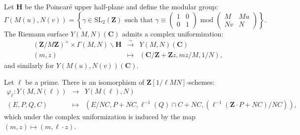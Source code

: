 \documentclass[10pt,letterpaper]{amsart}
\theoremstyle{plain}
\theoremstyle{definition}
\theoremstyle{definition}
\theoremstyle{plain}
\theoremstyle{plain}
\theoremstyle{plain}
\theoremstyle{remark}
\numberwithin{equation}{section}
\newcommand{\bC}{\mathbf{C}}
\newcommand{\Z}{\mathbf{Z}}
\begin{document}
Let $\mathbf{H}$ be the Poincar\'e upper half-plane and define the modular group:
\begin{equation*}
    \Gamma(M(u),N(v))=\left\{
  \gamma\in \mathrm{SL}_2(\Z) \text{ such that } \gamma\equiv\begin{pmatrix}
1 & 0\\
0 & 1 
\end{pmatrix}\text{ mod } \begin{pmatrix}
M & Mu\\
Nv & N 
\end{pmatrix} \right\}.
\end{equation*}
The Riemann surface $Y(M,N)(\bC)$ admits a complex uniformization:
\begin{equation*}
\begin{array}{ccc}
       (\Z/M\Z)^{\times}\times \Gamma(M,N)\backslash \mathbf{H}&\xrightarrow{\sim} &Y(M,N)(\bC)  \\
    (m,z) &\mapsto &(\bC/\Z+\Z z,mz/M,1/N), 
\end{array}
\end{equation*}
and similarly for $Y(M(u),N(v))(\bC)$.

Let $\ell$ be a prime. There is an isomorphism of $\Z[1/\ell MN]$-schemes:
\begin{equation*}
    \begin{array}{ccl}
         \varphi_\ell:Y(M,N(\ell))&\rightarrow &Y(M(\ell),N)  \\
        (E,P,Q,C)&\mapsto &(E/NC,P+NC,\ell^{-1}(Q)\cap C+NC,(\ell^{-1}(\Z\cdot P+NC)/NC)),
    \end{array}
\end{equation*}
which under the complex uniformization is induced by the map $(m,z)\mapsto (m,\ell\cdot z)$.
\end{document}
